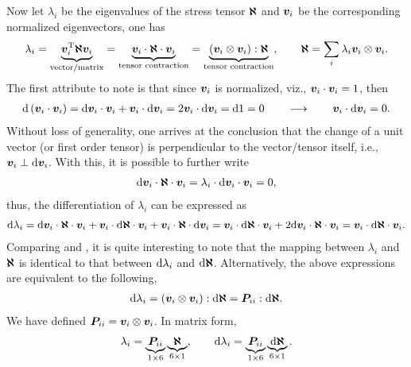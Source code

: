 Now let $\lambda_i$ be the eigenvalues of the stress tensor $\bm{\aleph}$ and $\bm{v}_i$ be the corresponding normalized eigenvectors, one has
\begin{gather}\label{eq:eigenvalue_def}
    \lambda_i=\underbrace{\bm{v}_i^{\mathrm{T}}\bm{\aleph}\bm{v}_i}_{\text{vector/matrix}}=\underbrace{\bm{v}_i\cdot\bm{\aleph}\cdot\bm{v}_i}_{\text{tensor contraction}}=\underbrace{\left(\bm{v}_i\otimes\bm{v}_i\right):\bm{\aleph}}_{\text{tensor contraction}},\qquad
    \bm{\aleph}=\sum_{i}\lambda_i\bm{v}_i\otimes\bm{v}_i.
\end{gather}
The first attribute to note is that since $\bm{v}_i$ is normalized, viz., $\bm{v}_i\cdot\bm{v}_i=1$, then
\begin{gather}
    \mathrm{d}\left(\bm{v}_i\cdot\bm{v}_i\right)=\mathrm{d}\bm{v}_i\cdot\bm{v}_i+\bm{v}_i\cdot\mathrm{d}\bm{v}_i=2\bm{v}_i\cdot\mathrm{d}\bm{v}_i=\mathrm{d}1=0\qquad\longrightarrow\qquad\bm{v}_i\cdot\mathrm{d}\bm{v}_i=0.
\end{gather}
Without loss of generality, one arrives at the conclusion that the change of a unit vector (or first order tensor) is perpendicular to the vector/tensor itself, i.e., $\bm{v}_i\perp\mathrm{d}\bm{v}_i$.
With this, it is possible to further write
\begin{gather}
    \mathrm{d}\bm{v}_i\cdot\bm{\aleph}\cdot\bm{v}_i=\lambda_i\cdot\mathrm{d}\bm{v}_i\cdot\bm{v}_i=0,
\end{gather}
thus, the differentiation of $\lambda_i$ can be expressed as
\begin{gather}\label{eq:eigenvalue_diff_def}
    \mathrm{d}\lambda_i=\mathrm{d}\bm{v}_i\cdot\bm{\aleph}\cdot\bm{v}_i+\bm{v}_i\cdot\mathrm{d}\bm{\aleph}\cdot\bm{v}_i+\bm{v}_i\cdot\bm{\aleph}\cdot\mathrm{d}\bm{v}_i=\bm{v}_i\cdot\mathrm{d}\bm{\aleph}\cdot\bm{v}_i+2\mathrm{d}\bm{v}_i\cdot\bm{\aleph}\cdot\bm{v}_i=\bm{v}_i\cdot\mathrm{d}\bm{\aleph}\cdot\bm{v}_i.
\end{gather}
Comparing  and , it is quite interesting to note that the mapping between $\lambda_i$ and $\bm{\aleph}$ is identical to that between $\mathrm{d}\lambda_i$ and $\mathrm{d}\bm{\aleph}$.
Alternatively, the above expressions are equivalent to the following,
\begin{gather}
    \mathrm{d}\lambda_i=\left(\bm{v}_i\otimes\bm{v}_i\right):\mathrm{d}\bm{\aleph}=\bm{P}_{ii}:\mathrm{d}\bm{\aleph}.
\end{gather}
We have defined $\bm{P}_{ii}=\bm{v}_i\otimes\bm{v}_i$.
In matrix form,
\begin{gather}
    \lambda_i=\underbrace{\bm{P}_{ii}}_{1\times6}\underbrace{\bm{\aleph}}_{6\times1},\qquad
    \mathrm{d}\lambda_i=\underbrace{\bm{P}_{ii}}_{1\times6}\underbrace{\mathrm{d}\bm{\aleph}}_{6\times1}.
\end{gather}

